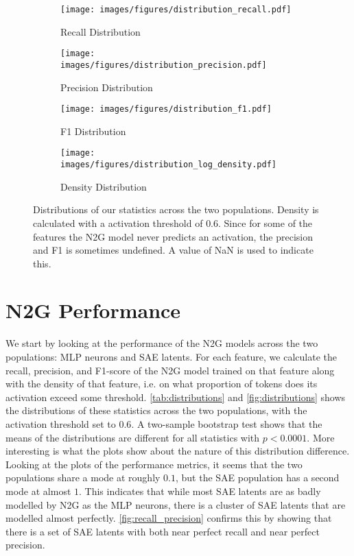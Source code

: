 \begin{figure}[ht]
    \centering
    
    \begin{subfigure}[b]{0.45\textwidth}
        \centering
        \texttt{[image: images/figures/distribution\_recall.pdf]}
        \caption{Recall Distribution}
        \label{fig:distributions_recall}
    \end{subfigure}
    \begin{subfigure}[b]{0.45\textwidth}
        \centering
        \texttt{[image: images/figures/distribution\_precision.pdf]}
        \caption{Precision Distribution}
        \label{fig:distributions_precision}
    \end{subfigure}
    
    \begin{subfigure}[b]{0.45\textwidth}
        \centering
        \texttt{[image: images/figures/distribution\_f1.pdf]}
        \caption{F1 Distribution}
        \label{fig:distributions_f1}
    \end{subfigure}
    \begin{subfigure}[b]{0.45\textwidth}
        \centering
        \texttt{[image: images/figures/distribution\_log\_density.pdf]}
        \caption{Density Distribution}
        \label{fig:distributions_log_density}
    \end{subfigure}
    
    \caption{Distributions of our statistics across the two populations. 
    Density is calculated with a activation threshold of $0.6$. Since for some of the features the N2G model never predicts an activation, the precision and F1 is sometimes undefined. A value of NaN is used to indicate this.}
    \label{fig:distributions}
\end{figure}

\section{N2G Performance}
We start by looking at the performance of the N2G models across the two populations: MLP neurons and SAE latents.
For each feature, we calculate the recall, precision, and F1-score of the N2G model trained on that feature along with the density of that feature, i.e. on what proportion of tokens does its activation exceed some threshold.
\autoref{tab:distributions} and \autoref{fig:distributions} shows the distributions of these statistics across the two populations, with the activation threshold set to $0.6$.
A two-sample bootstrap test shows that the means of the distributions are different for all statistics with $p<0.0001$.
More interesting is what the plots show about the nature of this distribution difference.
Looking at the plots of the performance metrics, it seems that the two populations share a mode at roughly $0.1$, but the SAE population has a second mode at almost $1$.
This indicates that while most SAE latents are as badly modelled by N2G as the MLP neurons, there is a cluster of SAE latents that are modelled almost perfectly.
\autoref{fig:recall_precision} confirms this by showing that there is a set of SAE latents with both near perfect recall and near perfect precision.

